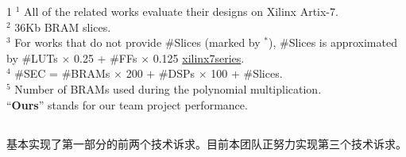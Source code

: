 \begin{table*} [hbtp]
{\begin{tabular}{ c|c|c|c|c|c||c|c|c|c }
        \end{tabular}
    }
    \begin{tablenotes}
        \item[1] 
        ${^1}$ All of the related works evaluate their designs on Xilinx Artix-7.\\
        ${^2}$ 36Kb BRAM slices.\\
        ${^3}$ For works that do not provide \#Slices (marked by  $^*$), \#Slices is approximated by \#LUTs $\times$ 0.25 + \#FFs $\times$ 0.125 
        \href{https://www.xilinx.com/content/dam/xilinx/support/documents/data_sheets/ds180_7Series_Overview.pdf}{xilinx7series}.\\
        ${^4}$ \#SEC = \#BRAMs $\times$ 200 + \#DSPs $\times$ 100 + \#Slices.\\
        ${^5}$ Number of BRAMs used during the polynomial multiplication.\\
        \textbullet ``\textbf{Ours}'' stands for our team project performance.
    \end{tablenotes}
\end{table*}

\subsection{}

基本实现了第一部分的前两个技术诉求。目前本团队正努力实现第三个技术诉求。
